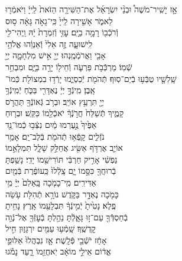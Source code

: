 \documentclass[twoside, openany, parskip=half, 11pt]{book}
\begin{document}
אָ֣ז \hfill
יָשִֽׁיר־מֹשֶׁה֩ \hfill וּבְנֵ֨י \hfill יִשְׂרָאֵ֜ל \hfill אֶת־הַשִּׁירָ֤ה \hfill הַזֹּאת֙ \hfill לַֽייָ֔ \hfill וַיֹּאמְֿר֖וּ \\
לֵאמֹ֑ר \hfill אָשִׁ֤ירָה לַֽייָ֙ כִּֽי־גָאֹ֣ה גָּאָ֔ה \hfill ס֥וּס \\
וְֿרֹכְֿב֖וֹ רָמָ֥ה בַיָּֽם׃ \hfill עׇזִּ֤י וְֿזִמְרָת֙ יָ֔הּ וַֽיְהִי־לִ֖י \\
לִֽישׁוּעָ֑ה \hfill זֶ֤ה אֵלִי֙ וְֿאַנְוֵ֔הוּ \hfill אֱלֹהֵ֥י \\
אָבִ֖י וַאֲרֹמְֿמֶֽנְהוּ׃ \hfill יְיָ֖ אִ֣ישׁ מִלְחָמָ֑ה יְיָ֖ \\
שְֿׁמֽוֹ׃ \hfill מַרְכְּֿֿבֹ֥ת פַּרְעֹ֛ה וְֿחֵיל֖וֹ יָרָ֣ה בַיָּ֑ם \hfill וּמִבְחַ֥ר\\
שָֽׁלִשָׁ֖יו טֻבְּֿע֥וּ בְֿיַם־סֽוּף׃ \hfill תְּֿהֹמֹ֖ת יְֿכַסְיֻ֑מוּ יָרְֿד֥וּ בִמְצוֹלֹ֖ת כְּֿמוֹ־\\
אָֽבֶן׃ \hfill מִֽינְֿךָ֣ יְיָ֔ נֶאְדָּרִ֖י בַּכֹּ֑חַ \hfill יְֿמִֽינְֿךָ֥ \\
יְיָ֖ תִּרְעַ֥ץ אוֹיֵֽב׃ \hfill וּבְרֹ֥ב גְּֿאוֹנְֿךָ֖ תַּהֲרֹ֣ס \\
קָמֶ֑יךָ \hfill תְּֿשַׁלַּח֙ חֲרֹ֣נְֿךָ֔ יֹאכְֿלֵ֖מוֹ כַּקַּֽשׁ׃ \hfill וּבְר֤וּחַ \\
אַפֶּ֙יךָ֙ נֶ֣עֶרְמוּ מַ֔יִם \hfill נִצְּֿב֥וּ כְֿמוֹ־נֵ֖ד \\
נֹזְֿלִ֑ים \hfill קָֽפְֿא֥וּ תְֿהֹמֹ֖ת בְּֿלֶב־יָֽם׃ \hfill אָמַ֥ר \\
אוֹיֵ֛ב אֶרְדֹּ֥ף אַשִּׂ֖יג \hfill אֲחַלֵּ֣ק שָׁלָ֑ל תִּמְלָאֵ֣מוֹ \\
נַפְשִׁ֔י \hfill אָרִ֣יק חַרְבִּ֔י תּוֹרִישֵׁ֖מוֹ יָדִֽי׃ \hfill נָשַׁ֥פְתָּ \\
בְֿרוּחֲךָ֖ כִּסָּ֣מוֹ יָ֑ם \hfill צָֽלְֿלוּ֙ כַּֽעוֹפֶ֔רֶת בְּֿמַ֖יִם \\
אַדִּירִֽים׃ \hfill מִֽי־כָמֹ֤כָה בָּֽאֵלִם֙ יְיָ֔ \hfill מִ֥י \\
כָּמֹ֖כָה נֶאְדָּ֣ר בַּקֹּ֑דֶשׁ \hfill נוֹרָ֥א תְֿהִלֹּ֖ת עֹ֥שֵׂה \\
פֶֽלֶא׃ \hfill נָטִ֙יתָ֙ יְֿמִ֣ינְֿךָ֔ תִּבְלָעֵ֖מוֹ אָֽרֶץ׃ \hfill נָחִ֥יתָ \\
בְֿחַסְדְּֿֿךָ֖ עַם־ז֣וּ גָּאָ֑לְֿתָּ \hfill נֵהַ֥לְתָּ בְֿעׇזְּֿךָ֖ אֶל־נְֿוֵ֥ה \\
קׇדְשֶֽׁךָ׃ \hfill שָֽׁמְֿע֥וּ עַמִּ֖ים יִרְגָּז֑וּן \hfill חִ֣יל \\
אָחַ֔ז יֹשְֿׁבֵ֖י פְּֿלָֽשֶׁת׃ \hfill אָ֤ז נִבְהֲלוּ֙ אַלּוּפֵ֣י \\
אֱד֔וֹם \hfill אֵילֵ֣י מוֹאָ֔ב יֹֽאחֲזֵ֖מוֹ רָ֑עַד \hfill נָמֹ֕גוּ \\
\end{document}
